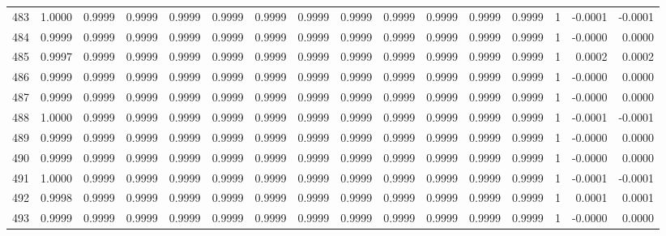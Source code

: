 \begin{tabular}{lrrrrrrrrrrrrrrr}
483 &      1.0000 &  0.9999 &  0.9999 &  0.9999 &  0.9999 &  0.9999 &  0.9999 &  0.9999 &  0.9999 &  0.9999 &   0.9999 &     0.9999 &      1 &                   -0.0001 &                    -0.0001 \\
484 &      0.9999 &  0.9999 &  0.9999 &  0.9999 &  0.9999 &  0.9999 &  0.9999 &  0.9999 &  0.9999 &  0.9999 &   0.9999 &     0.9999 &      1 &                   -0.0000 &                     0.0000 \\
485 &      0.9997 &  0.9999 &  0.9999 &  0.9999 &  0.9999 &  0.9999 &  0.9999 &  0.9999 &  0.9999 &  0.9999 &   0.9999 &     0.9999 &      1 &                    0.0002 &                     0.0002 \\
486 &      0.9999 &  0.9999 &  0.9999 &  0.9999 &  0.9999 &  0.9999 &  0.9999 &  0.9999 &  0.9999 &  0.9999 &   0.9999 &     0.9999 &      1 &                   -0.0000 &                     0.0000 \\
487 &      0.9999 &  0.9999 &  0.9999 &  0.9999 &  0.9999 &  0.9999 &  0.9999 &  0.9999 &  0.9999 &  0.9999 &   0.9999 &     0.9999 &      1 &                   -0.0000 &                     0.0000 \\
488 &      1.0000 &  0.9999 &  0.9999 &  0.9999 &  0.9999 &  0.9999 &  0.9999 &  0.9999 &  0.9999 &  0.9999 &   0.9999 &     0.9999 &      1 &                   -0.0001 &                    -0.0001 \\
489 &      0.9999 &  0.9999 &  0.9999 &  0.9999 &  0.9999 &  0.9999 &  0.9999 &  0.9999 &  0.9999 &  0.9999 &   0.9999 &     0.9999 &      1 &                   -0.0000 &                     0.0000 \\
490 &      0.9999 &  0.9999 &  0.9999 &  0.9999 &  0.9999 &  0.9999 &  0.9999 &  0.9999 &  0.9999 &  0.9999 &   0.9999 &     0.9999 &      1 &                   -0.0000 &                     0.0000 \\
491 &      1.0000 &  0.9999 &  0.9999 &  0.9999 &  0.9999 &  0.9999 &  0.9999 &  0.9999 &  0.9999 &  0.9999 &   0.9999 &     0.9999 &      1 &                   -0.0001 &                    -0.0001 \\
492 &      0.9998 &  0.9999 &  0.9999 &  0.9999 &  0.9999 &  0.9999 &  0.9999 &  0.9999 &  0.9999 &  0.9999 &   0.9999 &     0.9999 &      1 &                    0.0001 &                     0.0001 \\
493 &      0.9999 &  0.9999 &  0.9999 &  0.9999 &  0.9999 &  0.9999 &  0.9999 &  0.9999 &  0.9999 &  0.9999 &   0.9999 &     0.9999 &      1 &                   -0.0000 &                     0.0000 \\

\end{tabular}
